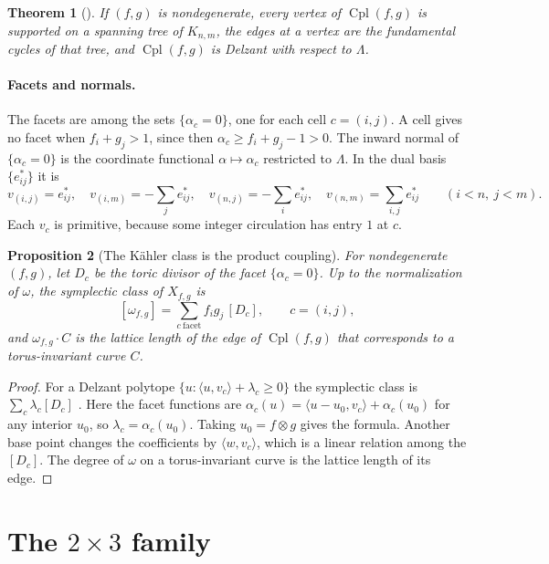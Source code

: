 \documentclass[11pt]{article}
\newtheorem{theorem}{Theorem}[section]
\newtheorem{proposition}[theorem]{Proposition}
\theoremstyle{definition}
\theoremstyle{remark}
\newcommand{\Cpl}{\operatorname{Cpl}}
\begin{document}
\begin{theorem}[{\cite[Thm.~6.4]{Conditionals}}]\label{thm:delzant}
If $(f,g)$ is nondegenerate, every vertex of $\Cpl(f,g)$ is supported on a spanning tree of $K_{n,m}$,
the edges at a vertex are the fundamental cycles of that tree, and $\Cpl(f,g)$ is Delzant with respect to
$\Lambda$.
\end{theorem}

\paragraph{Facets and normals.} The facets are among the sets $\{\alpha_c=0\}$, one for each cell
$c=(i,j)$. A cell gives no facet when $f_i+g_j>1$, since then $\alpha_c\ge f_i+g_j-1>0$. The inward normal of
$\{\alpha_c=0\}$ is the coordinate functional $\alpha\mapsto\alpha_c$ restricted to $\Lambda$. In the dual basis
$\{e^*_{ij}\}$ it is
\[
v_{(i,j)}=e^*_{ij},\quad v_{(i,m)}=-\textstyle\sum_je^*_{ij},\quad v_{(n,j)}=-\sum_ie^*_{ij},\quad
v_{(n,m)}=\sum_{i,j}e^*_{ij}\qquad(i<n,\ j<m).
\]
Each $v_c$ is primitive, because some integer circulation has entry $1$ at $c$.

\begin{proposition}[The Kähler class is the product coupling]\label{prop:kahler}
For nondegenerate $(f,g)$, let $D_c$ be the toric divisor of the facet $\{\alpha_c=0\}$. Up to the
normalization of $\omega$, the symplectic class of $X_{f,g}$ is
\[
[\omega_{f,g}]=\sum_{c\ \text{facet}}f_ig_j\,[D_c],\qquad c=(i,j),
\]
and $\omega_{f,g}\cdot C$ is the lattice length of the edge of $\Cpl(f,g)$ that corresponds to a
torus-invariant curve $C$.
\end{proposition}
\begin{proof}
For a Delzant polytope $\{u:\langle u,v_c\rangle+\lambda_c\ge0\}$ the symplectic class is
$\sum_c\lambda_c[D_c]$ \cite{Guillemin1994}. Here the facet functions are
$\alpha_c(u)=\langle u-u_0,v_c\rangle+\alpha_c(u_0)$ for any interior $u_0$, so $\lambda_c=\alpha_c(u_0)$.
Taking $u_0=f\otimes g$ gives the formula. Another base point changes the coefficients by
$\langle w,v_c\rangle$, which is a linear relation among the $[D_c]$. The degree of $\omega$ on a torus-invariant
curve is the lattice length of its edge.
\end{proof}

\section{The $2\times3$ family}\label{sec:2x3}
\end{document}
